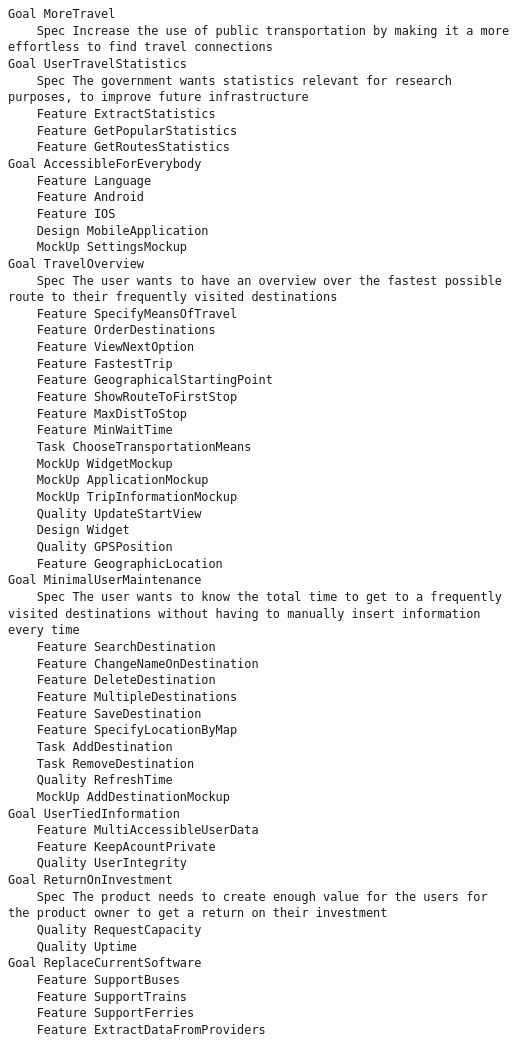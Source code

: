 

\begin{lstlisting}
Goal MoreTravel
	Spec Increase the use of public transportation by making it a more effortless to find travel connections
Goal UserTravelStatistics
	Spec The government wants statistics relevant for research purposes, to improve future infrastructure
	Feature ExtractStatistics
	Feature GetPopularStatistics
	Feature GetRoutesStatistics
Goal AccessibleForEverybody
	Feature Language
	Feature Android
	Feature IOS
	Design MobileApplication
	MockUp SettingsMockup
Goal TravelOverview
	Spec The user wants to have an overview over the fastest possible route to their frequently visited destinations
	Feature SpecifyMeansOfTravel
	Feature OrderDestinations
	Feature ViewNextOption
	Feature FastestTrip
	Feature GeographicalStartingPoint
	Feature ShowRouteToFirstStop
	Feature MaxDistToStop
	Feature MinWaitTime
	Task ChooseTransportationMeans
	MockUp WidgetMockup
	MockUp ApplicationMockup
	MockUp TripInformationMockup
	Quality UpdateStartView
	Design Widget
	Quality GPSPosition
	Feature GeographicLocation
Goal MinimalUserMaintenance
	Spec The user wants to know the total time to get to a frequently visited destinations without having to manually insert information every time
	Feature SearchDestination
	Feature ChangeNameOnDestination
	Feature DeleteDestination
	Feature MultipleDestinations
	Feature SaveDestination
	Feature SpecifyLocationByMap
	Task AddDestination
	Task RemoveDestination
	Quality RefreshTime
	MockUp AddDestinationMockup
Goal UserTiedInformation
	Feature MultiAccessibleUserData
	Feature KeepAcountPrivate
	Quality UserIntegrity
Goal ReturnOnInvestment
	Spec The product needs to create enough value for the users for the product owner to get a return on their investment
	Quality RequestCapacity
	Quality Uptime
Goal ReplaceCurrentSoftware
	Feature SupportBuses
	Feature SupportTrains
	Feature SupportFerries
	Feature ExtractDataFromProviders

\end{lstlisting}